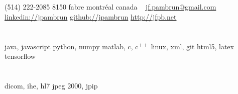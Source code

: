 \documentclass[print]{friggeri-cv}
\begin{document}

\newcommand{\eletr}{\href{http://www.etsmtl.ca/Programmes-Etudes/1er-cycle/Fiche-de-cours?Sigle=ELE747}{ele{\footnotesize747}}}
\newcommand{\eleenv}{\href{http://www.etsmtl.ca/Programmes-Etudes/1er-cycle/Fiche-de-cours?Sigle=ELE116}{ele{\footnotesize116}}}
\newcommand{\infmat}{\href{http://www.polymtl.ca/etudes/cours/details.php?sigle=INF1005a}{inf{\footnotesize1005}a}}
\newcommand{\gtssys}{\href{http://www.etsmtl.ca/Futurs-etudiants/Cycles-sup/Fiche-de-cours?Sigle=GTS840}{gts{\footnotesize840}}}

\begin{aside}
  \section{}
  {\small(514) 222-2085}
  {\small8150} fabre
  montréal
  canada
  ~
  \href{mailto:jf.pambrun@gmail.com}{jf.pambrun@gmail.com}
  \href{https://ca.linkedin.com/in/jpambrun}{linkedin://jpambrun}
  \href{http://github.com/jpambrun}{github://jpambrun}
  \href{http://jfpb.net}{http://jfpb.net}
  \section{}
  \section{}
  java, javascript
  python, numpy
  matlab, c, c{\tiny$^{++}$}
  linux, xml, git
  html{\small5}, latex
  tensorflow
  \section{}
  dicom, ihe, hl{\small7}
  jpeg {\small2000}, jpip
\end{aside}
\end{document}
